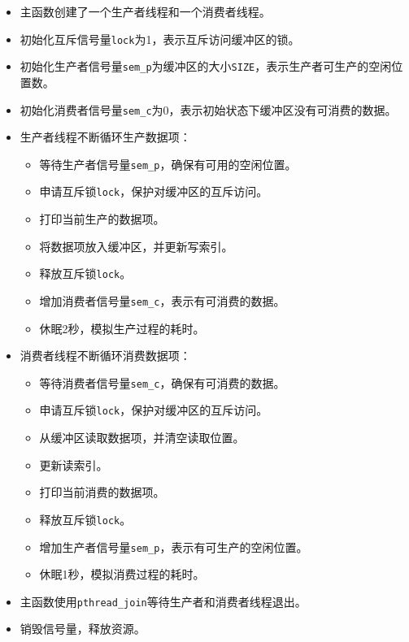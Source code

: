 \documentclass[12pt, a4paper, oneside]{ctexbook}
\numberwithin{figure}{section}
\begin{document}
\begin{itemize}
    \item 主函数创建了一个生产者线程和一个消费者线程。
    \item 初始化互斥信号量\texttt{lock}为1，表示互斥访问缓冲区的锁。
    \item 初始化生产者信号量\texttt{sem\_p}为缓冲区的大小\texttt{SIZE}，表示生产者可生产的空闲位置数。
    \item 初始化消费者信号量\texttt{sem\_c}为0，表示初始状态下缓冲区没有可消费的数据。
    \item 生产者线程不断循环生产数据项：
    \begin{itemize}
        \item 等待生产者信号量\texttt{sem\_p}，确保有可用的空闲位置。
        \item 申请互斥锁\texttt{lock}，保护对缓冲区的互斥访问。
        \item 打印当前生产的数据项。
        \item 将数据项放入缓冲区，并更新写索引。
        \item 释放互斥锁\texttt{lock}。
        \item 增加消费者信号量\texttt{sem\_c}，表示有可消费的数据。
        \item 休眠2秒，模拟生产过程的耗时。
    \end{itemize}
    \item 消费者线程不断循环消费数据项：
    \begin{itemize}
        \item 等待消费者信号量\texttt{sem\_c}，确保有可消费的数据。
        \item 申请互斥锁\texttt{lock}，保护对缓冲区的互斥访问。
        \item 从缓冲区读取数据项，并清空读取位置。
        \item 更新读索引。
        \item 打印当前消费的数据项。
        \item 释放互斥锁\texttt{lock}。
        \item 增加生产者信号量\texttt{sem\_p}，表示有可生产的空闲位置。
        \item 休眠1秒，模拟消费过程的耗时。
    \end{itemize}
    \item 主函数使用\texttt{pthread\_join}等待生产者和消费者线程退出。
    \item 销毁信号量，释放资源。
\end{itemize}
\end{document}
